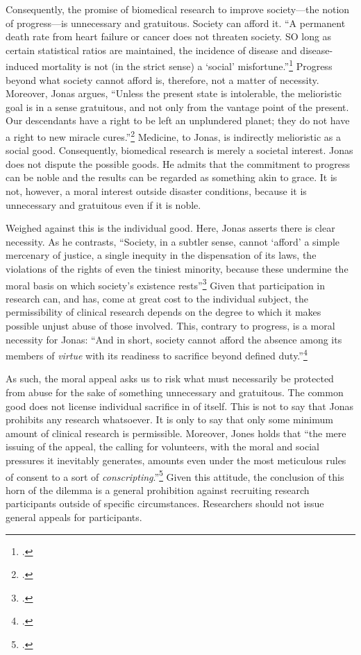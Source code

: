 \documentclass[letterpaper,notitlepage,12pt]{article}
\begin{document}
Consequently, the promise of biomedical research to improve society---the notion of progress---is unnecessary and gratuitous.
Society can afford it.
``A permanent death rate from heart failure or cancer does not threaten
society. SO long as certain statistical ratios are maintained, the
incidence of disease and disease-induced mortality is not (in the strict
sense) a `social' misfortune.''\footcite[p. 229]{jonas_philosophical_1969}
Progress beyond what society cannot afford is, therefore, not a matter of necessity.
Moreover, Jonas argues, ``Unless the present state is intolerable, the melioristic goal is in a sense gratuitous, and not only from the vantage point of the present. Our descendants have a right to be left an unplundered planet; they do not have a right to new miracle cures.''\footcite[p. 230]{jonas_philosophical_1969}
Medicine, to Jonas, is indirectly melioristic as a social good.
Consequently, biomedical research is merely a societal interest.
Jonas does not dispute the possible goods.
He admits that the commitment to progress can be noble and the results can
be regarded as something akin to grace.
It is not, however, a moral interest outside disaster conditions, because
it is unnecessary and gratuitous even if it is noble.

Weighed against this is the individual good.
Here, Jonas asserts there is clear necessity.
As he contrasts, ``Society, in a subtler sense, cannot `afford' a simple
mercenary of justice, a single inequity in the dispensation of its laws,
the violations of the rights of even the tiniest minority, because these
undermine the moral basis on which society's existence
rests''\footcite[p. 228]{jonas_philosophical_1969}
Given that participation in research can, and has, come at great cost to
the individual subject, the permissibility of clinical research depends on
the degree to which it makes possible unjust abuse of those involved.
This, contrary to progress, is a moral necessity for Jonas: ``And in short,
society cannot afford the absence among its members of \textit{virtue}
with its readiness to sacrifice beyond defined
duty.''\footcite[p. 228]{jonas_philosophical_1969}

As such, the moral appeal asks us to risk what must necessarily be
protected from abuse for the sake of something unnecessary and gratuitous.
The common good does not license individual sacrifice in of itself.
This is not to say that Jonas prohibits any research whatsoever.
It is only to say that only some minimum amount of clinical research is
permissible.
Moreover, Jones holds that ``the mere issuing of the appeal, the calling
for volunteers, with the moral and social pressures it inevitably generates,
amounts even under the most meticulous rules of consent to a sort of
\textit{conscripting}.''\footcite[p. 233]{jonas_philosophical_1969}
Given this attitude, the conclusion of this horn of the dilemma is a general prohibition against recruiting research participants outside of specific circumstances.
Researchers should not issue general appeals for participants.
\end{document}
